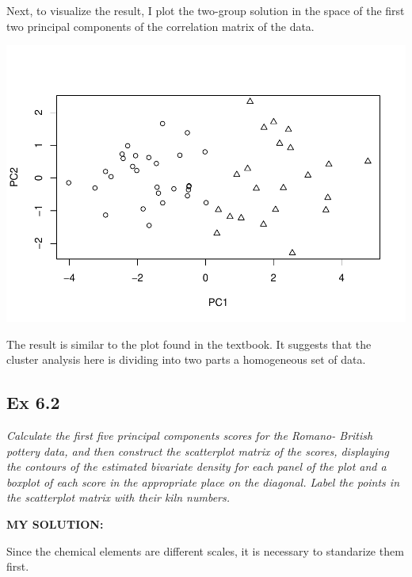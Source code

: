 \documentclass[
]{article}
\newenvironment{Shaded}{\begin{snugshade}}{\end{snugshade}}
\newcommand{\AttributeTok}[1]{\textcolor[rgb]{0.77,0.63,0.00}{#1}}
\newcommand{\DecValTok}[1]{\textcolor[rgb]{0.00,0.00,0.81}{#1}}
\newcommand{\FunctionTok}[1]{\textcolor[rgb]{0.00,0.00,0.00}{#1}}
\newcommand{\NormalTok}[1]{#1}
\newcommand{\OtherTok}[1]{\textcolor[rgb]{0.56,0.35,0.01}{#1}}
\newcommand{\SpecialCharTok}[1]{\textcolor[rgb]{0.00,0.00,0.00}{#1}}
\begin{document}
Next, to visualize the result, I plot the two-group solution in the
space of the first two principal components of the correlation matrix of
the data.

\begin{Shaded}
\end{Shaded}

\includegraphics[width=0.5\linewidth,height=0.5\textheight]{HUDM6122-Homework_06-Chenguang-Pan_files/figure-latex/unnamed-chunk-3-1}

The result is similar to the plot found in the textbook. It suggests
that the cluster analysis here is dividing into two parts a homogeneous
set of data.

\hypertarget{ex-6.2}{%
\subsection{Ex 6.2}\label{ex-6.2}}

\emph{Calculate the first five principal components scores for the
Romano- British pottery data, and then construct the scatterplot matrix
of the scores, displaying the contours of the estimated bivariate
density for each panel of the plot and a boxplot of each score in the
appropriate place on the diagonal. Label the points in the scatterplot
matrix with their kiln numbers.}

\textbf{MY SOLUTION:}

Since the chemical elements are different scales, it is necessary to
standarize them first.
\end{document}
